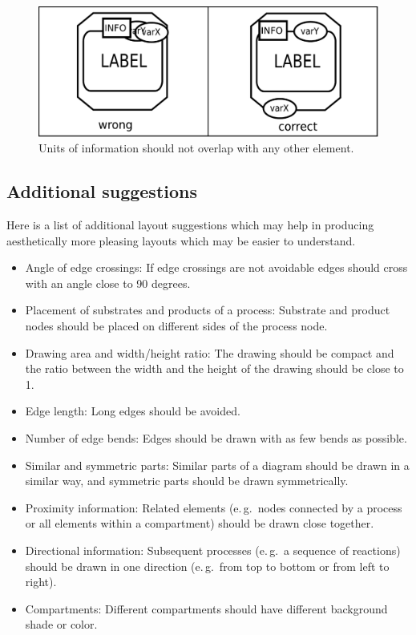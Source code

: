 \begin{figure}[h!]
  \centering
  \includegraphics[scale=0.5]{images/layout-unit-information}
  \caption{Units of information should not overlap with any
  other element.}\label{fig:layout7}
\end{figure}

\subsection{Additional suggestions}

Here is a list of additional layout suggestions which may help in
producing aesthetically more pleasing layouts which may be easier to
understand.

\begin{itemize}
  \item Angle of edge crossings: If edge crossings are not avoidable
  edges should cross with an angle close to 90 degrees.
  \item Placement of substrates and products of a process:
  Substrate and product nodes should be placed
  on different sides of the process node.
  \item Drawing area and width/height ratio: The drawing should
  be compact and the ratio between the width and the height
  of the drawing should be close to 1.
  \item Edge length: Long edges should be avoided.
  \item Number of edge bends: Edges should be drawn with
  as few bends as possible.
  \item Similar and symmetric parts: Similar parts of a diagram
  should be drawn in a similar way, and symmetric parts
  should be drawn symmetrically.
  \item Proximity information: Related elements (e.\,g.~nodes
  connected by a process or all elements within a compartment)
  should be drawn close together.
  \item Directional information: Subsequent processes (e.\,g.~a sequence
  of reactions) should be drawn in one direction (e.\,g.~from
  top to bottom or from left to right).
  \item Compartments: Different compartments should have different
  background shade or color.
\end{itemize}

